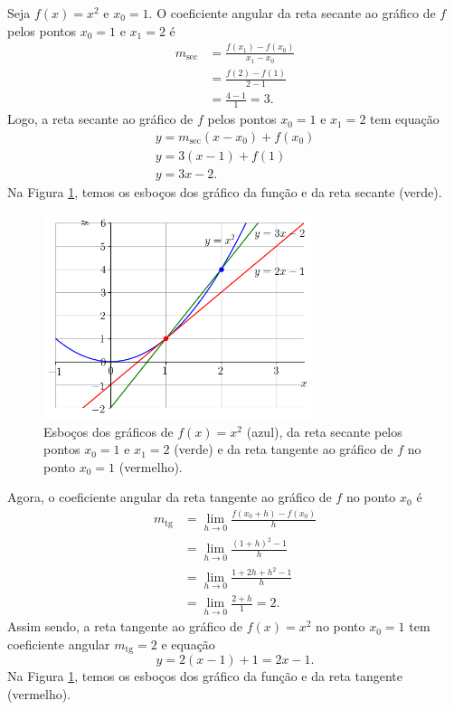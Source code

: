 \begin{ex}
  Seja $f(x)=x^2$ e $x_0 = 1$. O coeficiente angular da reta secante ao gráfico de $f$ pelos pontos $x_0=1$ e $x_1 = 2$ é
  \begin{align}
    m_{\text{sec}} &= \frac{f(x_1)-f(x_0)}{x_1-x_0}\\
                   &= \frac{f(2) - f(1)}{2-1}\\
                   &= \frac{4-1}{1} = 3.
  \end{align}
  Logo, a reta secante ao gráfico de $f$ pelos pontos $x_0=1$ e $x_1=2$ tem equação
  \begin{gather}
    y = m_{\text{sec}}(x-x_0) + f(x_0) \\
    y = 3(x-1)+f(1) \\
    y = 3x - 2.
  \end{gather}
  Na Figura \ref{fig:cap_deriv_ex_rt_x2}, temos os esboços dos gráfico da função e da reta secante (verde).
  
  \begin{figure}[H]
    \centering
    \includegraphics[width=0.7\textwidth]{./cap_deriv/dados/fig_cap_deriv_ex_rt_x2/fig}
    \caption{Esboços dos gráficos de $f(x)=x^2$ (azul), da reta secante pelos pontos $x_0=1$ e $x_1=2$ (verde) e da reta tangente ao gráfico de $f$ no ponto $x_0 = 1$ (vermelho).}
    \label{fig:cap_deriv_ex_rt_x2}
  \end{figure}

  Agora, o coeficiente angular da reta tangente ao gráfico de $f$ no ponto $x_0$ é
  \begin{align}
    m_{\text{tg}} &= \lim_{h\to 0} \frac{f(x_0+h)-f(x_0)}{h}\\
                  &= \lim_{h\to 0} \frac{(1+h)^2-1}{h}\\
                  &= \lim_{h\to 0} \frac{1+2h+h^2-1}{h}\\
                  &= \lim_{h\to 0} \frac{2+h}{1} = 2.
  \end{align}
  Assim sendo, a reta tangente ao gráfico de $f(x)=x^2$ no ponto $x_0=1$ tem coeficiente angular $m_{\text{tg}} = 2$ e equação
  \begin{equation}
    y = 2(x-1)+1 = 2x-1.
  \end{equation}
  Na Figura \ref{fig:cap_deriv_ex_rt_x2}, temos os esboços dos gráfico da função e da reta tangente (vermelho).
  

\end{ex}
